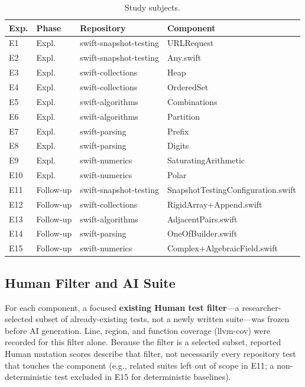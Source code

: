 \documentclass[10pt,conference]{IEEEtran}
\begin{document}
\begin{table}[t]
\centering
\caption{Study subjects.}
\label{tab:subjects}
\small
\setlength{\tabcolsep}{4pt}
\begin{tabular}{@{}llp{4.4cm}p{6.2cm}@{}}
\toprule
Exp. & Phase & Repository & Component \\
\midrule
E1 & Expl. & swift-snapshot-testing & URLRequest \\
E2 & Expl. & swift-snapshot-testing & Any.swift \\
E3 & Expl. & swift-collections & Heap \\
E4 & Expl. & swift-collections & OrderedSet \\
E5 & Expl. & swift-algorithms & Combinations \\
E6 & Expl. & swift-algorithms & Partition \\
E7 & Expl. & swift-parsing & Prefix \\
E8 & Expl. & swift-parsing & Digits \\
E9 & Expl. & swift-numerics & SaturatingArithmetic \\
E10 & Expl. & swift-numerics & Polar \\
E11 & Follow-up & swift-snapshot-testing & SnapshotTestingConfiguration.swift \\
E12 & Follow-up & swift-collections & RigidArray+Append.swift \\
E13 & Follow-up & swift-algorithms & AdjacentPairs.swift \\
E14 & Follow-up & swift-parsing & OneOfBuilder.swift \\
E15 & Follow-up & swift-numerics & Complex+AlgebraicField.swift \\
\bottomrule
\end{tabular}
\end{table}

\subsection{Human Filter and AI Suite}
For each component, a focused \textbf{existing Human test filter}---a researcher-selected subset of already-existing tests, not a newly written suite---was frozen before AI generation. Line, region, and function coverage (llvm-cov) were recorded for this filter alone. Because the filter is a selected subset, reported Human mutation scores describe that filter, not necessarily every repository test that touches the component (e.g., related suites left out of scope in E11; a non-deterministic test excluded in E15 for deterministic baselines).
\end{document}
